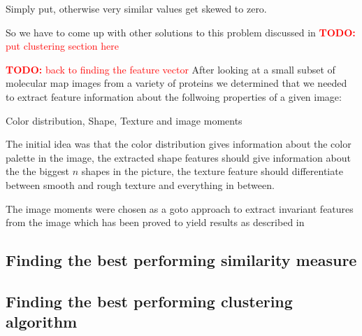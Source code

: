 \documentclass[journal]{vgtc}       %
\newcommand{\todo}[1]{\textcolor{red}{\textbf{TODO:} #1}}
\begin{document}
Simply put, otherwise very similar values get skewed to zero.

So we have to come up with other solutions to this problem discussed in \todo{put clustering section here}


\todo{back to finding the feature vector}
After looking at a small subset of molecular map images from a variety of proteins we determined that we needed to extract feature information about the follwoing properties of a given image: 

Color distribution, Shape, Texture and image moments 

The initial idea was that the color distribution gives information about the color palette in the image, the extracted shape features should give information about the the biggest \( n \) shapes in the picture, the texture feature should differentiate between smooth and rough texture and everything in between.

The image moments were chosen as a goto approach to extract invariant features from the image which has been proved to yield results as described in \cite{kolesar}


\subsection{Finding the best performing similarity measure}
\subsection{Finding the best performing clustering algorithm}
\end{document}
